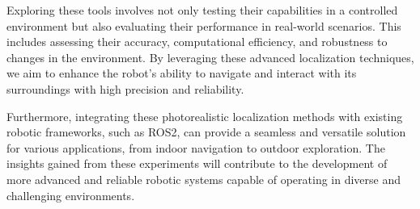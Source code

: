 Exploring these tools involves not only testing their capabilities in a controlled environment but also evaluating their performance in real-world scenarios. This includes assessing their accuracy, computational efficiency, and robustness to changes in the environment. By leveraging these advanced localization techniques, we aim to enhance the robot's ability to navigate and interact with its surroundings with high precision and reliability.

Furthermore, integrating these photorealistic localization methods with existing robotic frameworks, such as ROS2, can provide a seamless and versatile solution for various applications, from indoor navigation to outdoor exploration. The insights gained from these experiments will contribute to the development of more advanced and reliable robotic systems capable of operating in diverse and challenging environments.
